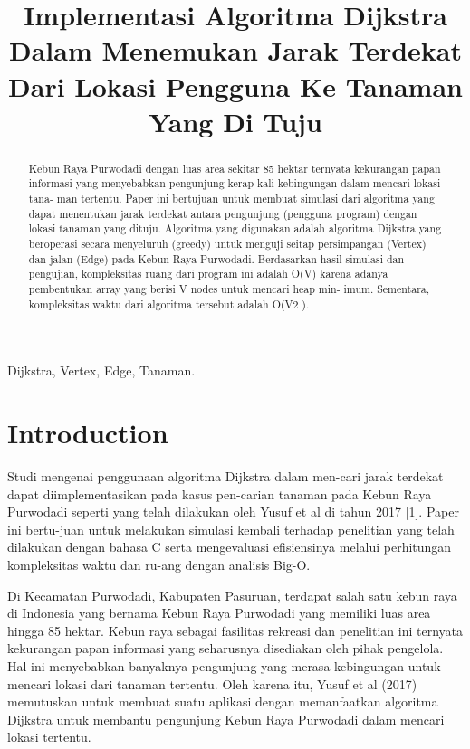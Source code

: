 \documentclass[conference]{IEEEtran}
\title{Implementasi Algoritma Dijkstra Dalam
Menemukan Jarak Terdekat Dari Lokasi Pengguna
Ke Tanaman Yang Di Tuju}
\author{\IEEEauthorblockN{Adro Anra Purnama}
\IEEEauthorblockA{\textit{School of Electrical Engineering and Informatics}\\
\textit{Institut Teknologi Bandung}\\
Bandung, Indonesia\\
Email: 13220005@std.stei.itb.ac.id}
}
\begin{document}
\maketitle
\begin{abstract}
    Kebun Raya Purwodadi dengan luas area sekitar 85
hektar ternyata kekurangan papan informasi yang menyebabkan
pengunjung kerap kali kebingungan dalam mencari lokasi tana-
man tertentu. Paper ini bertujuan untuk membuat simulasi
dari algoritma yang dapat menentukan jarak terdekat antara
pengunjung (pengguna program) dengan lokasi tanaman yang
dituju. Algoritma yang digunakan adalah algoritma Dijkstra
yang beroperasi secara menyeluruh (greedy) untuk menguji
seitap persimpangan (Vertex) dan jalan (Edge) pada Kebun
Raya Purwodadi. Berdasarkan hasil simulasi dan pengujian,
kompleksitas ruang dari program ini adalah O(V) karena adanya
pembentukan array yang berisi V nodes untuk mencari heap min-
imum. Sementara, kompleksitas waktu dari algoritma tersebut
adalah O(V2 ).
\end{abstract}   

\begin{IEEEkeywords}
    Dijkstra, Vertex, Edge, Tanaman.
\end{IEEEkeywords}

\section{Introduction}
Studi mengenai penggunaan algoritma Dijkstra dalam men-cari jarak terdekat dapat diimplementasikan pada kasus pen-carian tanaman pada Kebun Raya Purwodadi seperti yang telah
dilakukan oleh Yusuf et al di tahun 2017 [1]. Paper ini bertu-juan untuk melakukan simulasi kembali terhadap penelitian
yang telah dilakukan dengan bahasa C serta mengevaluasi
efisiensinya melalui perhitungan kompleksitas waktu dan ru-ang dengan analisis Big-O.

Di Kecamatan Purwodadi, Kabupaten Pasuruan, terdapat
salah satu kebun raya di Indonesia yang bernama Kebun
Raya Purwodadi yang memiliki luas area hingga 85 hektar.
Kebun raya sebagai fasilitas rekreasi dan penelitian ini ternyata
kekurangan papan informasi yang seharusnya disediakan oleh
pihak pengelola. Hal ini menyebabkan banyaknya pengunjung
yang merasa kebingungan untuk mencari lokasi dari tanaman
tertentu. Oleh karena itu, Yusuf et al (2017) memutuskan
untuk membuat suatu aplikasi dengan memanfaatkan algoritma
Dijkstra untuk membantu pengunjung Kebun Raya Purwodadi
dalam mencari lokasi tertentu.
\end{document}
